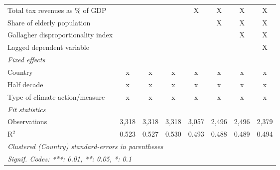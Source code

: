\begin{tabular}{lccccccc}
   Total tax revenues as \% of GDP                                                   &              &              &               & X             & X              & X              & X\\  
   Share of elderly population                                                       &              &              &               &               & X              & X              & X\\  
   Gallagher disproportionality index                                                &              &              &               &               &                & X              & X\\  
   Lagged dependent variable                                                         &              &              &               &               &                &                & X\\  
   \emph{Fixed effects}\\
   Country                                                                           & x            & x            & x             & x             & x              & x              & x\\  
   Half decade                                                                       & x            & x            & x             & x             & x              & x              & x\\  
   Type of climate action/measure                                                    & x            & x            & x             & x             & x              & x              & x\\  
   \midrule \emph{Fit statistics}\\
   Observations                                                                      & 3,318        & 3,318        & 3,318         & 3,057         & 2,496          & 2,496          & 2,379\\  
   R$^2$                                                                             & 0.523        & 0.527        & 0.530         & 0.493         & 0.488          & 0.489          & 0.494\\  
   \midrule
   \multicolumn{8}{l}{\emph{Clustered (Country) standard-errors in parentheses}}\\
   \multicolumn{8}{l}{\emph{Signif. Codes: ***: 0.01, **: 0.05, *: 0.1}}\\
\end{tabular}
\par\endgroup


